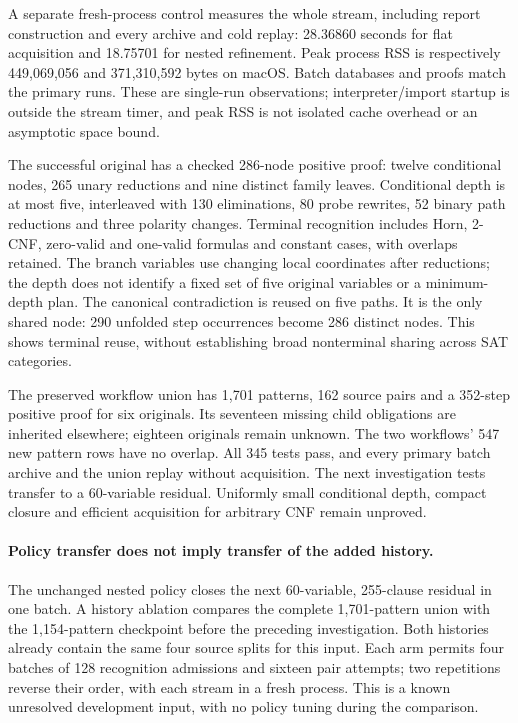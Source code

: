 \documentclass[11pt,a4paper]{article}
\numberwithin{equation}{section}
\theoremstyle{plain}
\theoremstyle{definition}
\theoremstyle{remark}
\begin{document}
A separate fresh-process control measures the whole stream, including report
construction and every archive and cold replay: 28.36860 seconds for flat
acquisition and 18.75701 for nested refinement. Peak process RSS is respectively
449,069,056 and 371,310,592 bytes on macOS. Batch databases and proofs match the
primary runs. These are single-run observations; interpreter/import startup is
outside the stream timer, and peak RSS is not isolated cache overhead or an
asymptotic space bound.

The successful original has a checked 286-node positive proof: twelve conditional
nodes, 265 unary reductions and nine distinct family leaves. Conditional depth
is at most five, interleaved with 130 eliminations, 80 probe rewrites, 52 binary
path reductions and three polarity changes. Terminal recognition includes Horn,
2-CNF, zero-valid and one-valid formulas and constant cases, with overlaps retained.
The branch variables use changing local coordinates after reductions; the depth
does not identify a fixed set of five original variables or a minimum-depth plan.
The canonical contradiction is reused on five paths. It is the only shared node:
290 unfolded step occurrences become 286 distinct nodes. This shows terminal
reuse, without establishing broad nonterminal sharing across SAT categories.

The preserved workflow union has 1,701 patterns, 162 source pairs and a 352-step
positive proof for six originals. Its seventeen missing child obligations are
inherited elsewhere; eighteen originals remain unknown. The two workflows'
547 new pattern rows have no overlap. All 345 tests pass, and every primary batch
archive and the union replay without acquisition. The next investigation tests
transfer to a 60-variable residual. Uniformly small conditional depth, compact
closure and efficient acquisition for arbitrary CNF remain unproved.

\paragraph{Policy transfer does not imply transfer of the added history.}
The unchanged nested policy closes the next 60-variable, 255-clause residual in
one batch. A history ablation compares the complete 1,701-pattern union with the
1,154-pattern checkpoint before the preceding investigation. Both histories
already contain the same four source splits for this input. Each arm permits
four batches of 128 recognition admissions and sixteen pair attempts; two
repetitions reverse their order, with each stream in a fresh process. This is a
known unresolved development input, with no policy tuning during the comparison.
\end{document}
